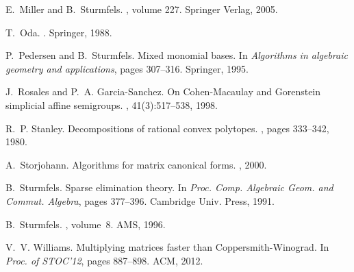 \documentclass[12pt]{article}
\numberwithin{equation}{section}
\numberwithin{theorem}{section}
\begin{document}
\begin{thebibliography}{10}
E.~Miller and B.~Sturmfels.
, volume 227.
\newblock Springer Verlag, 2005.

T.~Oda.
.
\newblock Springer, 1988.

P.~Pedersen and B.~Sturmfels.
\newblock Mixed monomial bases.
\newblock In {\em Algorithms in algebraic geometry and applications}, pages
  307--316. Springer, 1995.

J.~Rosales and P.~A. Garcia-Sanchez.
\newblock On {C}ohen-{M}acaulay and {G}orenstein simplicial affine semigroups.
,
  41(3):517--538, 1998.

R.~P. Stanley.
\newblock Decompositions of rational convex polytopes.
, pages 333--342, 1980.

A.~Storjohann.
\newblock Algorithms for matrix canonical forms.
, 2000.

B.~Sturmfels.
\newblock Sparse elimination theory.
\newblock In {\em Proc. Comp. Algebraic Geom. and Commut. Algebra}, pages
  377--396. Cambridge Univ. Press, 1991.

B.~Sturmfels.
, volume~8.
\newblock AMS, 1996.

V.~V. Williams.
\newblock Multiplying matrices faster than {C}oppersmith-{W}inograd.
\newblock In {\em Proc. of STOC'12}, pages 887--898. ACM, 2012.

\end{thebibliography}
\end{document}
